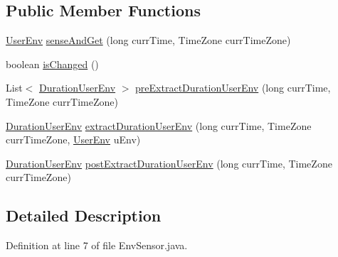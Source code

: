 \subsection*{\-Public \-Member \-Functions}
\begin{DoxyCompactItemize}
\item 
\hyperlink{classlab_1_1davidahn_1_1appshuttle_1_1collect_1_1env_1_1_user_env}{\-User\-Env} \hyperlink{interfacelab_1_1davidahn_1_1appshuttle_1_1collect_1_1env_1_1_env_sensor_ac5cda14c5a64edfe00669706bb58ad85}{sense\-And\-Get} (long curr\-Time, \-Time\-Zone curr\-Time\-Zone)
\item 
boolean \hyperlink{interfacelab_1_1davidahn_1_1appshuttle_1_1collect_1_1env_1_1_env_sensor_a17a7226afbf94c4b9f356be6254bb3bc}{is\-Changed} ()
\item 
\-List$<$ \hyperlink{classlab_1_1davidahn_1_1appshuttle_1_1collect_1_1env_1_1_duration_user_env}{\-Duration\-User\-Env} $>$ \hyperlink{interfacelab_1_1davidahn_1_1appshuttle_1_1collect_1_1env_1_1_env_sensor_ae717d1c26e7231b767f1d0a0ba053a91}{pre\-Extract\-Duration\-User\-Env} (long curr\-Time, \-Time\-Zone curr\-Time\-Zone)
\item 
\hyperlink{classlab_1_1davidahn_1_1appshuttle_1_1collect_1_1env_1_1_duration_user_env}{\-Duration\-User\-Env} \hyperlink{interfacelab_1_1davidahn_1_1appshuttle_1_1collect_1_1env_1_1_env_sensor_a28357b7b007f485cab126acbb305027f}{extract\-Duration\-User\-Env} (long curr\-Time, \-Time\-Zone curr\-Time\-Zone, \hyperlink{classlab_1_1davidahn_1_1appshuttle_1_1collect_1_1env_1_1_user_env}{\-User\-Env} u\-Env)
\item 
\hyperlink{classlab_1_1davidahn_1_1appshuttle_1_1collect_1_1env_1_1_duration_user_env}{\-Duration\-User\-Env} \hyperlink{interfacelab_1_1davidahn_1_1appshuttle_1_1collect_1_1env_1_1_env_sensor_a38d7c9ee629dcfb271f2c5e67ca8dbe8}{post\-Extract\-Duration\-User\-Env} (long curr\-Time, \-Time\-Zone curr\-Time\-Zone)
\end{DoxyCompactItemize}


\subsection{\-Detailed \-Description}


\-Definition at line 7 of file \-Env\-Sensor.\-java.



